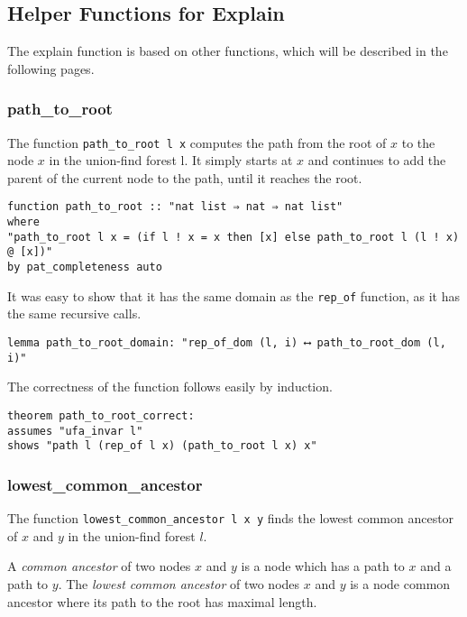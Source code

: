 \subsection{Helper Functions for Explain}

The explain function is based on other functions, which will be described in the following pages.

\subsubsection{path\_to\_root}

The function \lstinline{path_to_root l x} computes the path from the root of $x$ to the node $x$ in the union-find forest l. It simply starts at $x$ and continues to add the parent of the current node to the path, until it reaches the root.

\begin{lstlisting}
function path_to_root :: "nat list ⇒ nat ⇒ nat list"
where
"path_to_root l x = (if l ! x = x then [x] else path_to_root l (l ! x) @ [x])"
by pat_completeness auto
\end{lstlisting}

It was easy to show that it has the same domain as the \lstinline{rep_of} function, as it has the same recursive calls.

\begin{lstlisting}
lemma path_to_root_domain: "rep_of_dom (l, i) ⟷ path_to_root_dom (l, i)"
\end{lstlisting}

The correctness of the function follows easily by induction.

\begin{lstlisting}
theorem path_to_root_correct:
assumes "ufa_invar l"
shows "path l (rep_of l x) (path_to_root l x) x"
\end{lstlisting}

\subsubsection{lowest\_common\_ancestor}

The function \lstinline{lowest_common_ancestor l x y} finds the lowest common ancestor of $x$ and $y$ in the union-find forest $l$.

\begin{definition}
	A \emph{common ancestor} of two nodes $x$ and $y$ is a node which has a path to $x$ and a path to $y$.
	The \emph{lowest common ancestor} of two nodes $x$ and $y$ is a node common ancestor where its path to the root has maximal length.
\end{definition}

